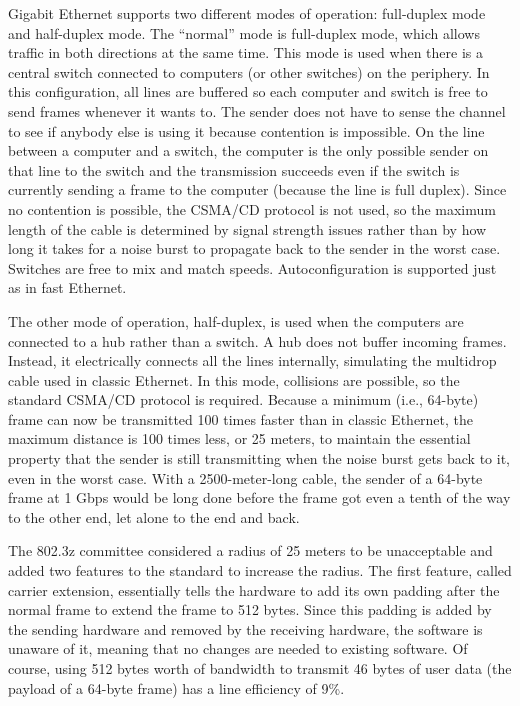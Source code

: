 Gigabit Ethernet supports two different modes of operation: full-duplex
mode and half-duplex mode. The ``normal'' mode is full-duplex mode,
which allows traffic in both directions at the same time. This mode is
used when there is a central switch connected to computers (or other
switches) on the periphery. In this configuration, all lines are
buffered so each computer and switch is free to send frames whenever it
wants to. The sender does not have to sense the channel to see if
anybody else is using it because contention is impossible. On the line
between a computer and a switch, the computer is the only possible
sender on that line to the switch and the transmission succeeds even if
the switch is currently sending a frame to the computer (because the
line is full duplex). Since no contention is possible, the CSMA/CD
protocol is not used, so the maximum length of the cable is determined
by signal strength issues rather than by how long it takes for a noise
burst to propagate back to the sender in the worst case. Switches are
free to mix and match speeds. Autoconfiguration is supported just as in
fast Ethernet.

The other mode of operation, half-duplex, is used when the computers are
connected to a hub rather than a switch. A hub does not buffer incoming
frames. Instead, it electrically connects all the lines internally,
simulating the multidrop cable used in classic Ethernet. In this mode,
collisions are possible, so the standard CSMA/CD protocol is required.
Because a minimum (i.e., 64-byte) frame can now be transmitted 100 times
faster than in classic Ethernet, the maximum distance is 100 times less,
or 25 meters, to maintain the essential property that the sender is
still transmitting when the noise burst gets back to it, even in the
worst case. With a 2500-meter-long cable, the sender of a 64-byte frame
at 1 Gbps would be long done before the frame got even a tenth of the
way to the other end, let alone to the end and back.

The 802.3z committee considered a radius of 25 meters to be unacceptable
and added two features to the standard to increase the radius. The first
feature, called {carrier extension}, essentially tells the hardware to
add its own padding after the normal frame to extend the frame to 512
bytes. Since this padding is added by the sending hardware and removed
by the receiving hardware, the software is unaware of it, meaning that
no changes are needed to existing software. Of course, using 512 bytes
worth of bandwidth to transmit 46 bytes of user data (the payload of a
64-byte frame) has a line efficiency of 9\%.

